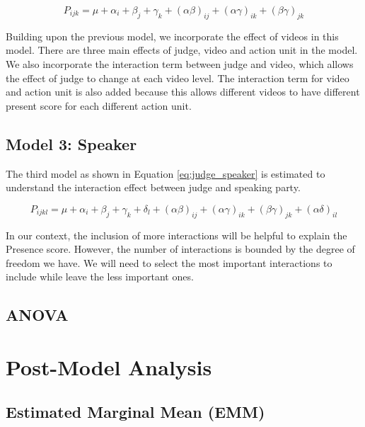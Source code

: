 \documentclass{monashthesis}
\begin{document}
\begin{equation}\label{eq:judge_video}
P_{ijk} = \mu + \alpha_i + \beta_j +\gamma_k + (\alpha\beta)_{ij} + (\alpha\gamma)_{ik} + (\beta\gamma)_{jk}
\end{equation}

Building upon the previous model, we incorporate the effect of videos in this model. There are three main effects of judge, video and action unit in the model. We also incorporate the interaction term between judge and video, which allows the effect of judge to change at each video level. The interaction term for video and action unit is also added because this allows different videos to have different present score for each different action unit.

\hypertarget{model-3-speaker}{%
\subsection{Model 3: Speaker}\label{model-3-speaker}}

The third model as shown in Equation \ref{eq:judge_speaker} is estimated to understand the interaction effect between judge and speaking party.

\begin{equation}\label{eq:judge_speaker}
P_{ijkl} = \mu + \alpha_i + \beta_j +\gamma_k + \delta_l + (\alpha\beta)_{ij} + (\alpha\gamma)_{ik} + (\beta\gamma)_{jk} + (\alpha\delta)_{il}
\end{equation}

In our context, the inclusion of more interactions will be helpful to explain the Presence score. However, the number of interactions is bounded by the degree of freedom we have. We will need to select the most important interactions to include while leave the less important ones.

\hypertarget{anova}{%
\subsection{ANOVA}\label{anova}}

\hypertarget{post-model-analysis}{%
\section{Post-Model Analysis}\label{post-model-analysis}}

\hypertarget{estimated-marginal-mean-emm}{%
\subsection{Estimated Marginal Mean (EMM)}\label{estimated-marginal-mean-emm}}
\end{document}
